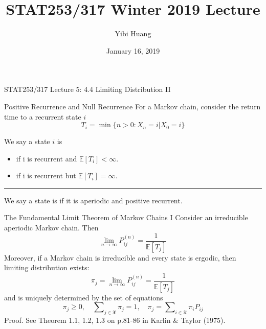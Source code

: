 \documentclass[letterpaper,handout, mathserif]{beamer}
\title{STAT253/317 Winter 2019 Lecture \chapnum}
\date{January 16, 2019}
\author{Yibi Huang}
\def\p{\mathrm P}
\def\E{\mathbb E}
\def\Sum{\sum\nolimits}
\def\X{\mathfrak{X}}
\def\chapnum{5}
\begin{document}
\begin{frame}{STAT253/317 Lecture \chapnum: 4.4 Limiting Distribution II}

\begin{block}{Positive Recurrence and Null Recurrence}
For a Markov chain, consider the return time to a recurrent state $i$
$$
T_i=\min\{n>0: X_n=i|X_0=i\}
$$

We say a state $i$ is
\begin{itemize}
\item {} if i is recurrent and $\E[T_i]<\infty.$
\item {} if i is recurrent but $\E[T_i]=\infty.$
\end{itemize}
\end{block}
\bigskip
\hrule\medskip
We say a state is  if it is aperiodic and positive recurrent.

\end{frame}
\begin{frame}{The Fundamental Limit Theorem of Markov Chains I}
Consider an irreducible aperiodic Markov chain. Then
$$
\lim_{n\to\infty}P^{(n)}_{ij}=\frac{1}{\E[T_j]}
$$
Moreover, if a Markov chain is irreducible and every state is ergodic, then limiting distribution exists: 
$$\pi_j=\lim_{n\to\infty}P^{(n)}_{ij}=\frac{1}{\E[T_j]}$$
and is uniquely determined by the set of equations
$$
\pi_j\ge 0,\quad\Sum_{j\in\X}\pi_j=1,\quad\pi_j=\Sum_{i\in\X}\pi_i P_{ij}
$$
Proof. See Theorem 1.1, 1.2, 1.3 on p.81-86 in Karlin \& Taylor (1975).
\end{frame}
\end{document}
